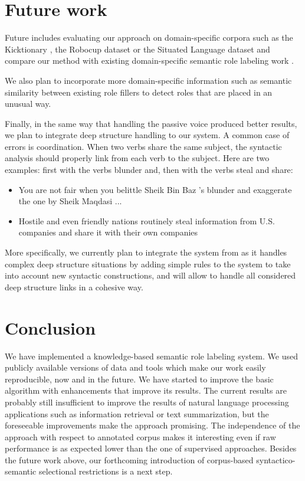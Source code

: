 \section{Future work}

Future includes evaluating our approach on domain-specific corpora such as the
Kicktionary \citep{schmidt2009kicktionary}, the Robocup dataset
\citep{chen2008learning} or the Situated Language dataset
\citep{bordes2010towards} and compare our method with existing
domain-specific semantic role labeling work
\citep{wyner2010lexical,hadouche2011annotation,goldwasser2013leveraging}.

We also plan to incorporate more domain-specific information such as semantic
similarity between existing role fillers to detect roles that are placed in an
unusual way.

Finally, in the same way that handling the passive voice produced better
results, we plan to integrate deep structure handling to our system. A common
case of errors is coordination. When two verbs share the same subject, the
syntactic analysis should properly link from each verb to the subject. Here are
two examples: first with the verbs blunder and, then with the verbs steal and
share:

\begin{itemize}
    \item You are not fair when you belittle Sheik Bin Baz 's blunder and
          exaggerate the one by Sheik Maqdasi ...
    \item Hostile and even friendly nations routinely steal information from
          U.S. companies and share it with their own companies
\end{itemize}

More specifically, we currently plan to integrate the system from
\citep{ribeyre2013systeme} as it handles complex deep structure situations
by adding simple rules to the system to take into account new syntactic
constructions, and will allow to handle all considered deep structure links in
a cohesive way.

\section{Conclusion}

We have implemented a knowledge-based semantic role labeling system. We used
publicly available versions of data and tools which make our work easily
reproducible, now and in the future. We have started to improve the basic
algorithm with enhancements that improve its results. The current results are
probably still insufficient to improve the results of natural language
processing applications such as information retrieval or text summarization,
but the foreseeable improvements make the approach promising. The independence
of the approach with respect to annotated corpus makes it interesting even if
raw performance is as expected lower than the one of supervised approaches.
Besides the future work above, our forthcoming introduction of corpus-based
syntactico-semantic selectional restrictions is a next step.
